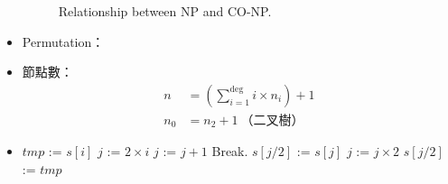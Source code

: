 \begin{itemize}
\begin{figure}[H]
        \caption{Relationship between NP and CO-NP.}
        \label{img:np-conp}
    \end{figure}
    \item Permutation：
    \begin{algorithm}[H]
        \begin{algorithmic}[1]
                    \State {}
                \Else
                        \State {}
                        \State {}
                        \State {}
                    \EndFor
                \EndIf
            \EndFunction
        \end{algorithmic}
    \end{algorithm}
    \item 節點數：\begin{equation}
        \begin{aligned}
            n & = (\sum_{i = 1}^{\deg}i \times n_i) + 1 \\
            n_0 & = n_2 + 1 \ \text{（二叉樹）}
        \end{aligned}
    \end{equation}
    \item \quad\quad
    \begin{algorithm}[H]
        \begin{algorithmic}[1]
                 
                    \State $tmp$ := $s[i]$
                    \State $j$ := $2 \times i$ 
                     
                         
                             
                                \State $j$ := $j + 1$
                            \EndIf
                        \EndIf
                            \State Break.
                        \Else {}
                            \State $s[j / 2]$ := $s[j]$
                            \State $j$ := $j \times 2$
                        \EndIf
                    \EndWhile
                    \State $s[j / 2]$ := $tmp$
                \EndFor
            \EndFunction
        \end{algorithmic}

\end{algorithm}
\end{itemize}
